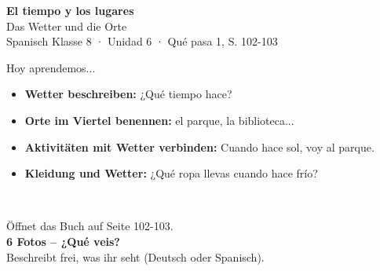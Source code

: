 \documentclass[aspectratio=169,11pt]{beamer}
\newcommand{\phase}[1]{\begin{center}\colorbox{spanisch}{\textcolor{white}{\large\bfseries #1}}\end{center}}
\begin{document}
\begin{frame}
\begin{center}
\vspace{1cm}
{\Huge\bfseries\textcolor{spanisch}{El tiempo y los lugares}}\\[0.5cm]
{\Large Das Wetter und die Orte}\\[1cm]
{\normalsize Spanisch Klasse 8 · Unidad 6 · Qué pasa 1, S. 102-103}
\end{center}
\end{frame}

\begin{frame}{Hoy aprendemos...}
\begin{itemize}
\setlength\itemsep{1em}
\item[\textcolor{spanisch}{\textbullet}] \textbf{Wetter beschreiben:} ¿Qué tiempo hace?
\item[\textcolor{spanisch}{\textbullet}] \textbf{Orte im Viertel benennen:} el parque, la biblioteca...
\item[\textcolor{spanisch}{\textbullet}] \textbf{Aktivitäten mit Wetter verbinden:} Cuando hace sol, voy al parque.
\item[\textcolor{spanisch}{\textbullet}] \textbf{Kleidung und Wetter:} ¿Qué ropa llevas cuando hace frío?
\end{itemize}
\end{frame}


\begin{frame}{}
\phase{Einstieg: ¿Qué veis?}
\vspace{0.5cm}
\begin{center}
{\Large Öffnet das Buch auf Seite 102-103.}\\[1cm]
{\LARGE\bfseries 6 Fotos – ¿Qué veis?}\\[0.5cm]
{\normalsize Beschreibt frei, was ihr seht (Deutsch oder Spanisch).}
\end{center}
\end{frame}

\end{document}

